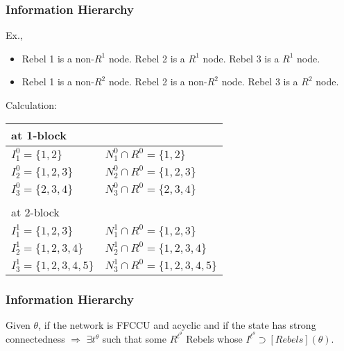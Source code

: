 \documentclass[10pt]{beamer}
\begin{document}
\begin{frame}
  \frametitle{Information Hierarchy}

Ex.,
\begin{itemize}
\item Rebel 1 is a non-$R^1$ node. Rebel 2 is a $R^1$ node. Rebel 3 is a $R^1$ node.
\item Rebel 1 is a non-$R^2$ node. Rebel 2 is a non-$R^2$ node. Rebel 3 is a $R^2$ node.

\end{itemize}



\begin{center}
\end{center}

Calculation:

\begin{table}[h]
\begin{tabular}{l l}
at 1-block &    \\
\hline
$I^0_1=\{1,2\} $ &  $N^0_1\cap R^0=\{1,2\}$  \\
$I^0_2=\{1,2,3\}$ & $N^0_2\cap R^0=\{1,2,3\} $  \\
$I^0_3=\{2,3,4\}$ & $N^0_3\cap R^0=\{2,3,4\}$    \\
&    \\

at 2-block &    \\
\hline
$I^1_1=\{1,2,3\} $ &  $N^1_1\cap R^0=\{1,2,3\}$  \\
$I^1_2=\{1,2,3,4\}$ & $N^1_2\cap R^0=\{1,2,3,4\} $  \\
$I^1_3=\{1,2,3,4,5\}$ & $N^1_3\cap R^0=\{1,2,3,4,5\}$    \\
\end{tabular}
\end{table}


\end{frame}


\begin{frame}
  \frametitle{Information Hierarchy}


\begin{theorem}
\label{lemma_empty}
Given $\theta$, if the network is FFCCU and acyclic and if the state has strong connectedness $\Rightarrow$ $\exists t^{\theta}$ such that some $R^{t^{\theta}}$ Rebels whose $I^{t^{\theta}}\supset [Rebels](\theta)$.
\end{theorem} 
\end{frame}
\end{document}
